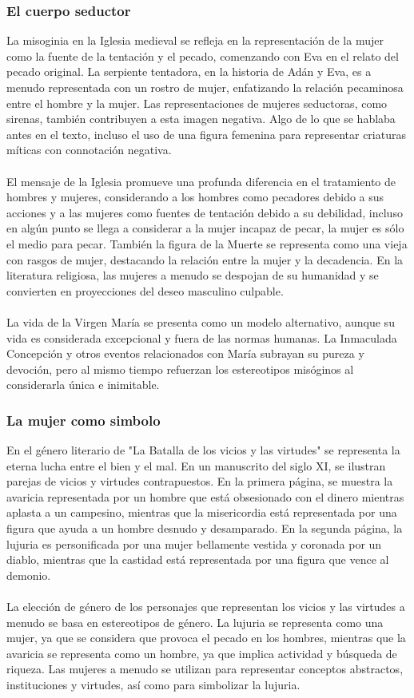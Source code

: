 \documentclass{report}
\begin{document}
\subsubsection{El cuerpo seductor}
La misoginia en la Iglesia medieval se refleja en la representación de la mujer como la fuente de la tentación y el pecado, comenzando con Eva en el relato del pecado original. La serpiente tentadora, en la historia de Adán y Eva, es a menudo representada con un rostro de mujer, enfatizando la relación pecaminosa entre el hombre y la mujer. Las representaciones de mujeres seductoras, como sirenas, también contribuyen a esta imagen negativa. Algo de lo que se hablaba antes en el texto, incluso el uso de una figura femenina para representar criaturas míticas con connotación negativa. 
\\\\
El mensaje de la Iglesia promueve una profunda diferencia en el tratamiento de hombres y mujeres, considerando a los hombres como pecadores debido a sus acciones y a las mujeres como fuentes de tentación debido a su debilidad, incluso en algún punto se llega a considerar a la mujer incapaz de pecar, la mujer es sólo el medio para pecar. También la figura de la Muerte se representa como una vieja con rasgos de mujer, destacando la relación entre la mujer y la decadencia. En la literatura religiosa, las mujeres a menudo se despojan de su humanidad y se convierten en proyecciones del deseo masculino culpable.
\\\\
La vida de la Virgen María se presenta como un modelo alternativo, aunque su vida es considerada excepcional y fuera de las normas humanas. La Inmaculada Concepción y otros eventos relacionados con María subrayan su pureza y devoción, pero al mismo tiempo refuerzan los estereotipos misóginos al considerarla única e inimitable.
\subsubsection{La mujer como simbolo}
En el género literario de "La Batalla de los vicios y las virtudes" se representa la eterna lucha entre el bien y el mal. En un manuscrito del siglo XI, se ilustran parejas de vicios y virtudes contrapuestos. En la primera página, se muestra la avaricia representada por un hombre que está obsesionado con el dinero mientras aplasta a un campesino, mientras que la misericordia está representada por una figura que ayuda a un hombre desnudo y desamparado. En la segunda página, la lujuria es personificada por una mujer bellamente vestida y coronada por un diablo, mientras que la castidad está representada por una figura que vence al demonio.
\\\\
La elección de género de los personajes que representan los vicios y las virtudes a menudo se basa en estereotipos de género. La lujuria se representa como una mujer, ya que se considera que provoca el pecado en los hombres, mientras que la avaricia se representa como un hombre, ya que implica actividad y búsqueda de riqueza. Las mujeres a menudo se utilizan para representar conceptos abstractos, instituciones y virtudes, así como para simbolizar la lujuria.
\end{document}
